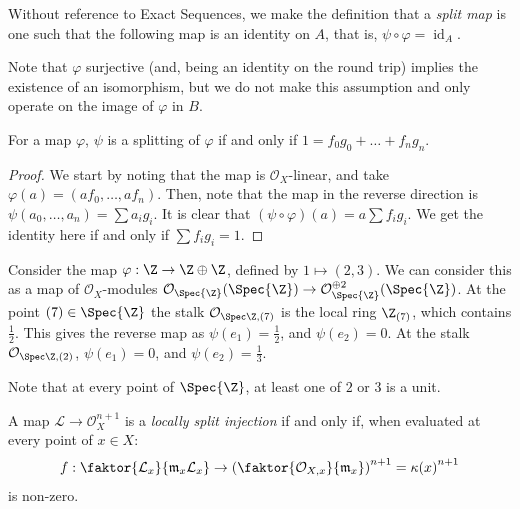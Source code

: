 \begin{definition}[Splitting]
    Without reference to Exact Sequences, we make the definition that a \emph{split map} is one such that the following map is an identity on $A$, that is, $\psi\circ\varphi=\operatorname{id}_A$.
    \begin{figure}[H]
        \centering
    \end{figure}

    Note that $\varphi$ surjective (and, being an identity on the round trip) implies the existence of an isomorphism, but we do not make this assumption and only operate on the image of $\varphi$ in $B$.
\end{definition}

\begin{proposition}
    For a map $\varphi$, $\psi$ is a splitting of $\varphi$ if and only if $1=f_0g_0+\dots+f_ng_n$.
    \begin{proof}
        We start by noting that the map is $\mathcal{O}_X$-linear, and take $\varphi(a)=(af_0,\dots,af_n)$.
        Then, note that the map in the reverse direction is $\psi(a_0,\dots,a_n)=\sum a_ig_i$.
        It is clear that $(\psi\circ\varphi)(a)=a\sum f_ig_i$.
        We get the identity here if and only if $\sum f_ig_i=1$.
    \end{proof}
\end{proposition}

\begin{example}
    Consider the map $\varphi:\Z\to\Z\oplus\Z$, defined by $1\mapsto(2,3)$.
    We can consider this as a map of $\mathcal{O}_X$-modules $\mathcal{O}_{\Spec{\Z}}(\Spec{\Z})\to\mathcal{O}_{\Spec{\Z}}^{\oplus 2}(\Spec{\Z})$.
    At the point $(7)\in\Spec{\Z}$ the stalk $\mathcal{O}_{\Spec\Z,(7)}$ is the local ring $\Z_{(7)}$, which contains $\frac{1}{2}$.
    This gives the reverse map as $\psi(e_1)=\frac{1}{2}$, and $\psi(e_2)=0$.
    At the stalk $\mathcal{O}_{\Spec\Z,(2)}$, $\psi(e_1)=0$, and $\psi(e_2)=\frac{1}{3}$.
    
    Note that at every point of $\Spec{\Z}$, at least one of $2$ or $3$ is a unit.
\end{example}

\begin{definition}
    A map $\mathcal{L}\to\mathcal{O}_X^{n+1}$ is a \emph{locally split injection} if and only if, when evaluated at every point of $x\in X$:
    \begin{align*}
        f:\faktor{\mathcal{L}_x}{\frak{m}_x\mathcal{L}_x}\to\left(\faktor{\mathcal{O}_{X,x}}{\frak{m}_x}\right)^{n+1}=\kappa{(x)}^{n+1}
    \end{align*}
    is non-zero.
\end{definition}


